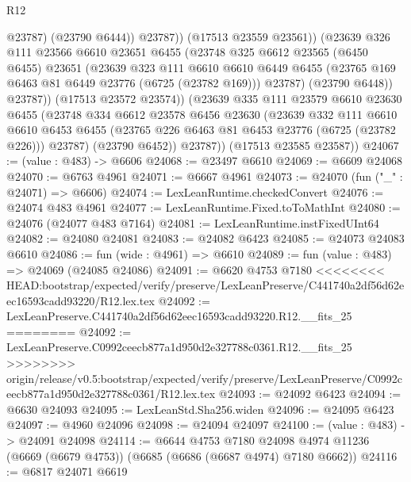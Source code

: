 \begin{lexlean}{R12}
\begin{coremodule}
{{{{{{{{{{{{{{{{{{{{{{{{{{{{{{{{{{{{{{{{{{{{{{{{{{{{{{{{{{{{{{{{{{{{{{{{{{{{{{{{{{                      @23787)
                    (@23790 @6444))
                  @23787))
              (@17513 @23559 @23561))
            (@23639
              @326
              @111
              @23566
              @6610
              @23651
              @6455
              (@23748
                @325
                @6612
                @23565
                (@6450 @6455)
                @23651
                (@23639
                  @323
                  @111
                  @6610
                  @6610
                  @6449
                  @6455
                  (@23765 @169 @6463 @81 @6449 @23776 (@6725 (@23782 @169)))
                  @23787)
                (@23790 @6448))
              @23787))
          (@17513 @23572 @23574))
        (@23639
          @335
          @111
          @23579
          @6610
          @23630
          @6455
          (@23748
            @334
            @6612
            @23578
            @6456
            @23630
            (@23639
              @332
              @111
              @6610
              @6610
              @6453
              @6455
              (@23765 @226 @6463 @81 @6453 @23776 (@6725 (@23782 @226)))
              @23787)
            (@23790 @6452))
          @23787))
      (@17513 @23585 @23587))
@24067 := (value : @483) -> @6606
@24068 := @23497 @6610
@24069 := @6609 @24068
@24070 := @6763 @4961
@24071 := @6667 @4961
@24073 := @24070 (fun ("_" : @24071) => @6606)
@24074 := LexLeanRuntime.checkedConvert
@24076 := @24074 @483 @4961
@24077 := LexLeanRuntime.Fixed.toToMathInt
@24080 := @24076 (@24077 @483 @7164)
@24081 := LexLeanRuntime.instFixedUInt64
@24082 := @24080 @24081
@24083 := @24082 @6423
@24085 := @24073 @24083 @6610
@24086 := fun (wide : @4961) => @6610
@24089 := fun (value : @483) => @24069 (@24085 @24086)
@24091 := @6620 @4753 @7180
<<<<<<<< HEAD:bootstrap/expected/verify/preserve/LexLeanPreserve/C441740a2df56d62eec16593cadd93220/R12.lex.tex
@24092 := LexLeanPreserve.C441740a2df56d62eec16593cadd93220.R12.__fits_25
========
@24092 := LexLeanPreserve.C0992ceecb877a1d950d2e327788c0361.R12.__fits_25
>>>>>>>> origin/release/v0.5:bootstrap/expected/verify/preserve/LexLeanPreserve/C0992ceecb877a1d950d2e327788c0361/R12.lex.tex
@24093 := @24092 @6423
@24094 := @6630 @24093
@24095 := LexLeanStd.Sha256.widen
@24096 := @24095 @6423
@24097 := @4960 @24096
@24098 := @24094 @24097
@24100 := (value : @483) -> @24091 @24098
@24114 := @6644
    @4753
    @7180
    @24098
    @4974
    @11236
    (@6669 (@6679 @4753))
    (@6685 (@6686 (@6687 @4974) @7180 @6662))
@24116 := @6817 @24071 @6619
}}}}}}}}}}}}}}}}}}}}}}}}}}}}}}}}}}}}}}}}}}}}}}}}}}}}}}}}}}}}}}}}}}}}}}}}}}}}}}}}}}
\end{coremodule}
\end{lexlean}
